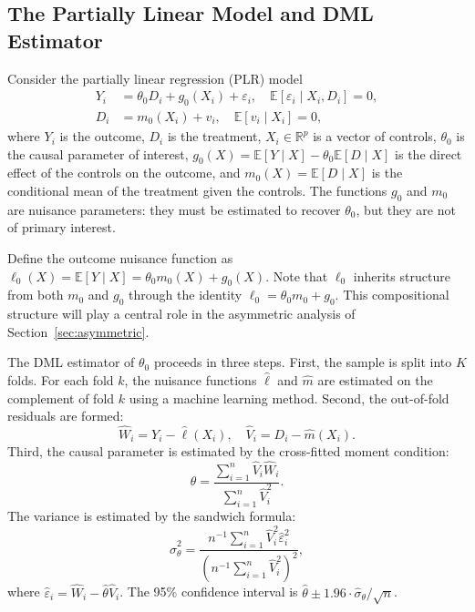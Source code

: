 \documentclass[a4paper,10.5pt]{article}
\begin{document}
\subsection{The Partially Linear Model and DML Estimator}\label{sec:plr}

Consider the partially linear regression (PLR) model
\begin{align}
    Y_i &= \theta_0 D_i + g_0(X_i) + \varepsilon_i, \quad \mathbb{E}[\varepsilon_i \mid X_i, D_i] = 0, \label{eq:plr_y} \\
    D_i &= m_0(X_i) + v_i, \quad \mathbb{E}[v_i \mid X_i] = 0, \label{eq:plr_d}
\end{align}
where $Y_i$ is the outcome, $D_i$ is the treatment, $X_i \in \mathbb{R}^p$ is a vector of controls, $\theta_0$ is the causal parameter of interest, $g_0(X) = \mathbb{E}[Y \mid X] - \theta_0 \mathbb{E}[D \mid X]$ is the direct effect of the controls on the outcome, and $m_0(X) = \mathbb{E}[D \mid X]$ is the conditional mean of the treatment given the controls. The functions $g_0$ and $m_0$ are nuisance parameters: they must be estimated to recover $\theta_0$, but they are not of primary interest.

Define the outcome nuisance function as $\ell_0(X) = \mathbb{E}[Y \mid X] = \theta_0 m_0(X) + g_0(X)$. Note that $\ell_0$ inherits structure from both $m_0$ and $g_0$ through the identity $\ell_0 = \theta_0 m_0 + g_0$. This compositional structure will play a central role in the asymmetric analysis of Section~\ref{sec:asymmetric}.

The DML estimator of $\theta_0$ proceeds in three steps. First, the sample is split into $K$ folds. For each fold $k$, the nuisance functions $\hat{\ell}$ and $\hat{m}$ are estimated on the complement of fold $k$ using a machine learning method. Second, the out-of-fold residuals are formed:
\begin{equation}
    \hat{W}_i = Y_i - \hat{\ell}(X_i), \quad \hat{V}_i = D_i - \hat{m}(X_i).
\end{equation}
Third, the causal parameter is estimated by the cross-fitted moment condition:
\begin{equation}\label{eq:dml_estimator}
    \hat{\theta} = \frac{\sum_{i=1}^{n} \hat{V}_i \hat{W}_i}{\sum_{i=1}^{n} \hat{V}_i^2}.
\end{equation}
The variance is estimated by the sandwich formula:
\begin{equation}\label{eq:variance}
    \hat{\sigma}^2_\theta = \frac{n^{-1} \sum_{i=1}^{n} \hat{V}_i^2 \hat{\varepsilon}_i^2}{\left( n^{-1} \sum_{i=1}^{n} \hat{V}_i^2 \right)^2},
\end{equation}
where $\hat{\varepsilon}_i = \hat{W}_i - \hat{\theta} \hat{V}_i$. The 95\% confidence interval is $\hat{\theta} \pm 1.96 \cdot \hat{\sigma}_\theta / \sqrt{n}$.
\end{document}
